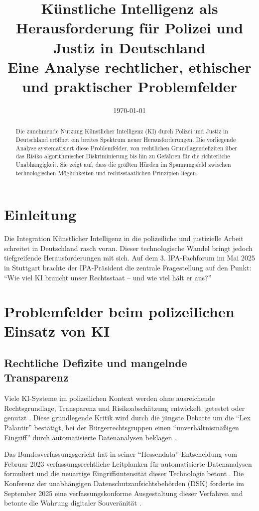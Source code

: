 \documentclass[12pt,a4paper]{article}
\title{Künstliche Intelligenz als Herausforderung für Polizei und Justiz in Deutschland\\
	\large Eine Analyse rechtlicher, ethischer und praktischer Problemfelder}
\author{}
\date{\today}
\begin{document}
	
	\maketitle
	
	\begin{abstract}
		Die zunehmende Nutzung Künstlicher Intelligenz (KI) durch Polizei und Justiz in Deutschland eröffnet ein breites Spektrum neuer Herausforderungen. Die vorliegende Analyse systematisiert diese Problemfelder, von rechtlichen Grundlagendefiziten über das Risiko algorithmischer Diskriminierung bis hin zu Gefahren für die richterliche Unabhängigkeit. Sie zeigt auf, dass die größten Hürden im Spannungsfeld zwischen technologischen Möglichkeiten und rechtsstaatlichen Prinzipien liegen.
	\end{abstract}
	
	\section{Einleitung}
	
	Die Integration Künstlicher Intelligenz in die polizeiliche und justizielle Arbeit schreitet in Deutschland rasch voran. Dieser technologische Wandel bringt jedoch tiefgreifende Herausforderungen mit sich. Auf dem 3. IPA-Fachforum im Mai 2025 in Stuttgart brachte der IPA-Präsident die zentrale Fragestellung auf den Punkt: \enquote{Wie viel KI braucht unser Rechtsstaat – und wie viel hält er aus?} \cite{IPA2025}
	
	\section{Problemfelder beim polizeilichen Einsatz von KI}
	
	\subsection{Rechtliche Defizite und mangelnde Transparenz}
	
	Viele KI-Systeme im polizeilichen Kontext werden ohne ausreichende Rechtsgrundlage, Transparenz und Risikoabschätzung entwickelt, getestet oder genutzt \cite{Peteranderl2025}. Diese grundlegende Kritik wird durch die jüngste Debatte um die \enquote{Lex Palantir} bestätigt, bei der Bürgerrechtsgruppen einen \enquote{unverhältnismäßigen Eingriff} durch automatisierte Datenanalysen beklagen \cite{FR2026}.
	
	Das Bundesverfassungsgericht hat in seiner \enquote{Hessendata}-Entscheidung vom Februar 2023 verfassungsrechtliche Leitplanken für automatisierte Datenanalysen formuliert und die neuartige Eingriffsintensität dieser Technologie betont \cite{VerfBlog2026}. Die Konferenz der unabhängigen Datenschutzaufsichtsbehörden (DSK) forderte im September 2025 eine verfassungskonforme Ausgestaltung dieser Verfahren und betonte die Wahrung digitaler Souveränität \cite{DSK2025}.
	
\end{document}
